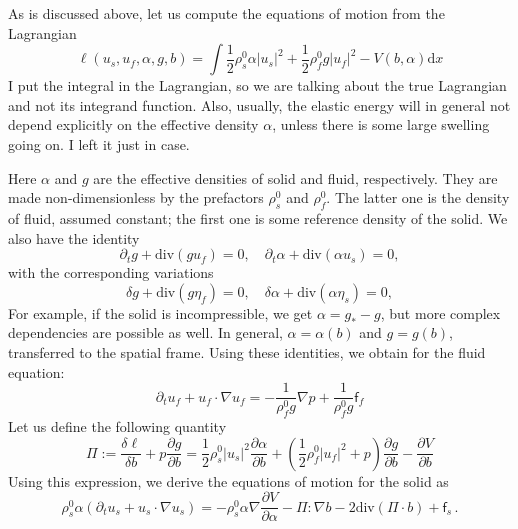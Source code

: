 \documentclass[12pt]{article}
\numberwithin{theorem}{section}
\newcommand{\pp}[2]{\frac{\partial #1}{\partial #2}}
\newcommand{\dede}[2]{\frac{\delta #1}{\delta #2}}
\begin{document}
\color{magenta} 
\begin{framed} 
As is discussed above, let us compute the equations of motion from the Lagrangian 
\begin{equation} 
\ell(u_s,u_f, \alpha, g,b)= \int \frac{1}{2}\rho_s^0 \alpha |u_s|^2 + \frac{1}{2} \rho_f^0 g |u_f|^2  - V(b,\alpha) \mbox{d} x 
\label{Lagr_2}
\end{equation} 
I put the integral in the Lagrangian, so we are talking about the true Lagrangian and not its integrand function. Also, usually, the elastic energy will in general not depend explicitly on the effective density $\alpha$, unless there is some large swelling going on. I left it just in case. 

Here $\alpha$ and $g$ are the effective densities of solid and fluid, respectively. They are made non-dimensionless by the prefactors $\rho_s^0$ and $\rho_f^0$. The latter one is the density of fluid, assumed constant; the first one is some reference density of the solid. We also have the identity 
\begin{equation} 
\partial_t g + \mbox{div} (gu_f) =0,  \quad \partial_t \alpha + \mbox{div} ( \alpha u_s) =0,
\label{g_alpha_id} 
\end{equation} 
with the corresponding variations 
\begin{equation} 
\delta g + \mbox{div} (g \eta_f) =0,  \quad \delta \alpha + \mbox{div} ( \alpha \eta_s ) =0,
\label{var_g_alpha_id} 
\end{equation} 
For example, if the solid is incompressible, we get $\alpha = g_*-g$, but more complex dependencies are possible as well. In general,  $\alpha=\alpha(b)$ and $g=g(b)$, transferred to the spatial frame. 
Using these identities, we obtain for the fluid equation:  
\begin{equation} 
\label{fluid_eq} 
\partial_t u_f  + u_f \cdot \nabla u_f =   -\frac{1}{\rho_f^0 g} \nabla p  + \frac{1}{\rho_f^0 g} \mathsf{f}_f 
\end{equation} 
Let us define the following quantity 
\begin{equation} 
\label{delta_l_b} 
\Pi := \dede{\ell}{b} + p\pp{g}{b} = \frac{1}{2} \rho_s^0  |u_s|^2 \pp{\alpha}{b} +\left(  \frac{1}{2} \rho_f^0  |u_f|^2 + p \right) \pp{g}{b} -\pp{V}{b} 
\end{equation} 
Using this expression, we derive the equations of motion for the solid as 
\begin{equation} 
\rho_s^0 \alpha \left( \partial_t u_s + u_s \cdot \nabla u_s \right) =  - \rho_s^0 \alpha \nabla \pp{V}{\alpha} -\Pi : \nabla b -2  \mbox{div} (\Pi \cdot b) + \mathsf{f}_s \,. 

\end{equation}
\end{framed}
\end{document}
